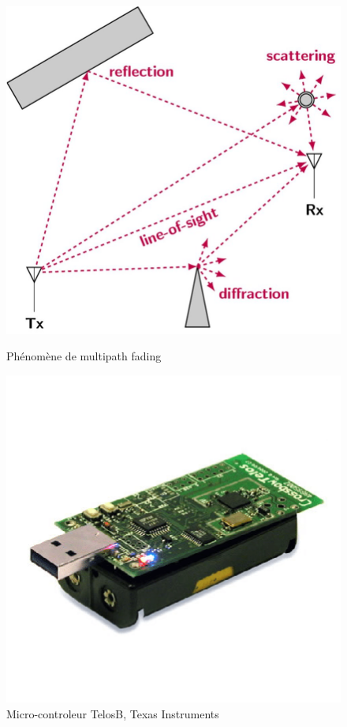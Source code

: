 \documentclass[]{report}
\begin{document}
\begin{figure}[!ht]
	\centering
	\begin{minipage}{0.43\textwidth}
		\centering
		\includegraphics[width=\textwidth]{multipath}
		\caption{Phénomène de multipath fading\cite{multipath}}
		\label{fig:multipath}
	\end{minipage}\hfill
	\begin{minipage}{0.43\textwidth}
		\centering
		\includegraphics[width=\textwidth]{TelosB}
		\caption{Micro-controleur TelosB, Texas Instruments \cite{telosb}}
		\label{fig:telosb}
	\end{minipage}	
\end{figure}
\end{document}
